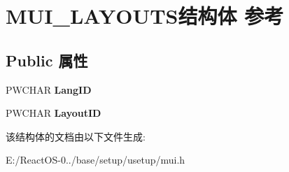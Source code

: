 \hypertarget{struct_m_u_i___l_a_y_o_u_t_s}{}\section{M\+U\+I\+\_\+\+L\+A\+Y\+O\+U\+T\+S结构体 参考}
\label{struct_m_u_i___l_a_y_o_u_t_s}
\subsection*{Public 属性}
\begin{DoxyCompactItemize}
\item 
\mbox{\label{struct_m_u_i___l_a_y_o_u_t_s_a84d463f0fd2e910c8fc77563d5616ad6}} 
P\+W\+C\+H\+AR {\bfseries Lang\+ID}
\item 
\mbox{\label{struct_m_u_i___l_a_y_o_u_t_s_a7fe0b599223a25c6974c4d0a623c1aad}} 
P\+W\+C\+H\+AR {\bfseries Layout\+ID}
\end{DoxyCompactItemize}


该结构体的文档由以下文件生成\+:\begin{DoxyCompactItemize}
\item 
E\+:/\+React\+O\+S-\/0../base/setup/usetup/mui.\+h\end{DoxyCompactItemize}
